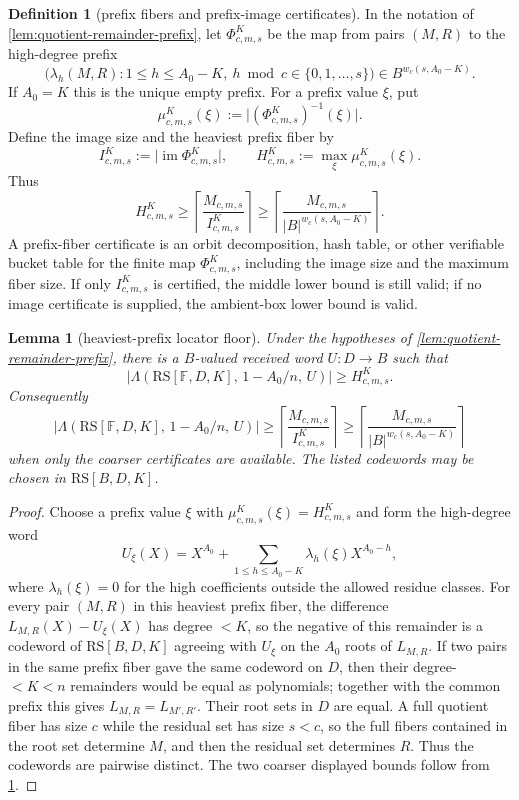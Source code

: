 \documentclass[11pt]{article}
\newtheorem{lemma}[theorem]{Lemma}
\theoremstyle{definition}
\newtheorem{definition}[theorem]{Definition}
\theoremstyle{remark}
\newcommand{\F}{\mathbb{F}}
\newcommand{\B}{B}
\newcommand{\RS}{\mathrm{RS}}
\newcommand{\Lst}{\Lambda}
\begin{document}
\begin{definition}[prefix fibers and prefix-image certificates]
\label{def:prefix-fiber-certificate}
In the notation of \cref{lem:quotient-remainder-prefix}, let
$\Phi_{c,m,s}^{K}$ be the map from pairs $(M,R)$ to the high-degree prefix
\[
        \bigl(\lambda_h(M,R):1\le h\le A_0-K,
              \ h\bmod c\in\{0,1,\ldots,s\}\bigr)
        \in \B^{w_c(s,A_0-K)} .
\]
If $A_0=K$ this is the unique empty prefix.  For a prefix value $\xi$, put
\[
        \mu_{c,m,s}^{K}(\xi)
        :=\bigl| (\Phi_{c,m,s}^{K})^{-1}(\xi)\bigr|.
\]
Define the image size and the heaviest prefix fiber by
\[
        I_{c,m,s}^{K}:=\bigl|\operatorname{im}\Phi_{c,m,s}^{K}\bigr|,
        \qquad
        H_{c,m,s}^{K}:=\max_{\xi}\mu_{c,m,s}^{K}(\xi).
\]
Thus
\[
        H_{c,m,s}^{K}
        \ge
        \left\lceil\frac{M_{c,m,s}}{I_{c,m,s}^{K}}\right\rceil
        \ge
        \left\lceil\frac{M_{c,m,s}}{|\B|^{w_c(s,A_0-K)}}\right\rceil .
\]
A prefix-fiber certificate is an orbit decomposition, hash table, or other
verifiable bucket table for the finite map $\Phi_{c,m,s}^{K}$, including the
image size and the maximum fiber size.  If only $I_{c,m,s}^{K}$ is certified,
the middle lower bound is still valid; if no image certificate is supplied, the
ambient-box lower bound is valid.
\end{definition}

\begin{lemma}[heaviest-prefix locator floor]
\label{lem:heaviest-prefix-locator-floor}
Under the hypotheses of \cref{lem:quotient-remainder-prefix}, there is a
$\B$-valued received word $U:D\to\B$ such that
\[
        \bigl|\Lst(\RS[\F,D,K],\,1-A_0/n,\,U)\bigr|
        \ge H_{c,m,s}^{K}.
\]
Consequently
\[
        \bigl|\Lst(\RS[\F,D,K],\,1-A_0/n,\,U)\bigr|
        \ge
        \left\lceil \frac{M_{c,m,s}}{I_{c,m,s}^{K}}\right\rceil
        \ge
        \left\lceil \frac{M_{c,m,s}}{|\B|^{w_c(s,A_0-K)}}\right\rceil
\]
when only the coarser certificates are available.  The listed codewords may be
chosen in $\RS[\B,D,K]$.
\end{lemma}

\begin{proof}
Choose a prefix value $\xi$ with
$\mu_{c,m,s}^{K}(\xi)=H_{c,m,s}^{K}$ and form the high-degree word
\[
        U_\xi(X)=X^{A_0}+\sum_{1\le h\le A_0-K}
        \lambda_h(\xi)X^{A_0-h},
\]
where $\lambda_h(\xi)=0$ for the high coefficients outside the allowed
residue classes.  For every pair $(M,R)$ in this heaviest prefix fiber, the difference
$L_{M,R}(X)-U_\xi(X)$ has degree $<K$, so the negative of this remainder is a
codeword of $\RS[\B,D,K]$ agreeing with $U_\xi$ on the $A_0$ roots of
$L_{M,R}$.  If two pairs in the same prefix fiber gave the same codeword on
$D$, then their degree-$<K<n$ remainders would be equal as polynomials; together
with the common prefix this gives $L_{M,R}=L_{M',R'}$.  Their root sets in $D$
are equal.  A full quotient fiber has size $c$ while the residual set has size
$s<c$, so the full fibers contained in the root set determine $M$, and then the
residual set determines $R$.  Thus the codewords are pairwise distinct.  The two
coarser displayed bounds follow from \cref{def:prefix-fiber-certificate}.
\end{proof}
\end{document}
